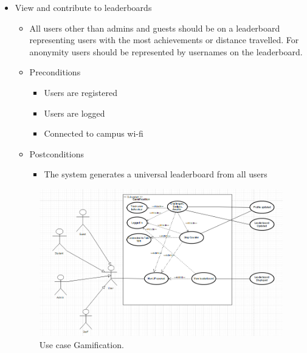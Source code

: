 \documentclass[12pt]{article}
\begin{document}
\begin{enumerate}
\begin{itemize}
				\item View and contribute to leaderboards
				\begin{itemize}
					\item All users other than admins and guests should be on a leaderboard representing users with the most achievements or distance travelled. For anonymity users should be represented by usernames on the leaderboard.
					\item Preconditions
					\begin{itemize}
						\item Users are registered
						\item Users are logged
						\item Connected to campus wi-fi
					\end{itemize}
					\item Postconditions
					\begin{itemize}
						\item The system generates a universal leaderboard from all users
					\end{itemize}
				\end{itemize}
				\begin{figure}
				    \includegraphics[width=\linewidth]{useCaseGamification.png}
				    \caption{Use case Gamification.}
  \label{fig:gamification}
				\end{figure}
			\end{itemize}
			

\end{enumerate}
\end{document}
